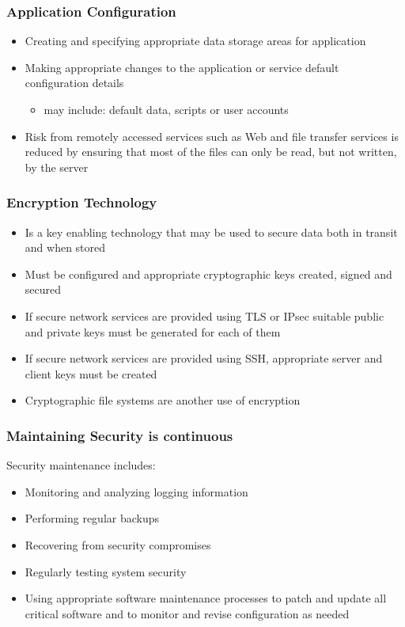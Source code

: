 \subsubsection{Application Configuration}
\begin{itemize}
    \item Creating and specifying appropriate data storage areas for application
    \item Making appropriate changes to the application or service default configuration details
    \begin{itemize}
        \item may include: default data, scripts or user accounts
    \end{itemize}
    \item Risk from remotely accessed services such as Web and file transfer services is reduced by ensuring that most of the files can only be read, but not written, by the server
\end{itemize}

\subsubsection{Encryption Technology}
\begin{itemize}
    \item Is a key enabling technology that may be used to secure data both in transit and when stored
    \item Must be configured and appropriate cryptographic keys created, signed and secured
    \item If secure network services are provided using TLS or IPsec suitable public and private keys must be generated for each of them
    \item If secure network services are provided using SSH, appropriate server and client keys must be created
    \item Cryptographic file systems are another use of encryption
\end{itemize}

\subsubsection{Maintaining Security is continuous}
Security maintenance includes:
\begin{itemize}
    \item Monitoring and analyzing logging information
    \item Performing regular backups
    \item Recovering from security compromises
    \item Regularly testing system security
    \item Using appropriate software maintenance processes to patch and update all critical software and to monitor and revise configuration as needed
\end{itemize}

